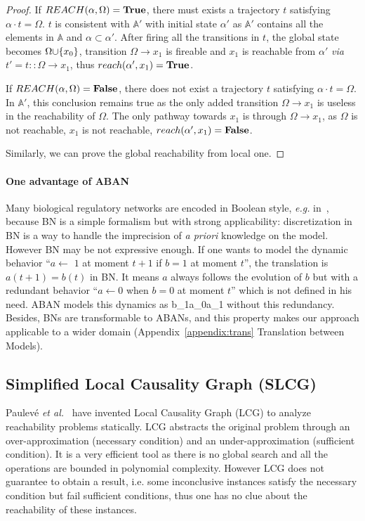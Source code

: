 \begin{proof}
If $REACH(\alpha,\Omega)=\mathbf{True}$, there must exists a trajectory $t$ satisfying $\alpha\cdot t=\Omega$.
$t$ is consistent with $\mathbb{A}'$ with initial state $\alpha'$ as $\mathbb{A}'$ contains all the elements in $\mathbb{A}$ and $\alpha\subset\alpha'$.
After firing all the transitions in $t$, the global state becomes $\Omega\addset{x_0}$, transition $\Omega\to x_1$ is fireable and $x_1$ is reachable from $\alpha'$ \textit{via} $t'=t::\Omega\to x_1$, thus $reach(\alpha', x_1)=\mathbf{True}$. 

If $REACH(\alpha,\Omega)=\mathbf{False}$, there does not exist a trajectory $t$ satisfying $\alpha\cdot t=\Omega$.
In $\mathbb{A}'$, this conclusion remains true as the only added transition $\Omega\to x_1$ is useless in the reachability of $\Omega$.
The only pathway towards $x_1$ is through $\Omega\to x_1$, as $\Omega$ is not reachable, $x_1$ is not reachable, $reach(\alpha', x_1)=\mathbf{False}$.

Similarly, we can prove the global reachability from local one.
\end{proof}

\paragraph{\textbf{One advantage of ABAN}}\label{par:advantage}
Many biological regulatory networks are encoded in Boolean style, \textit{e.g.} in~\cite{akutsu2007control,kauffman1969}, because BN is a simple formalism but with strong applicability: discretization in BN is a way to handle the imprecision of \textit{a priori} knowledge on the model.
However BN may be not expressive enough.
If one wants to model the dynamic behavior ``$a\gets$ $1$ at moment $t+1$ if $b=1$ at moment $t$'', the translation is $a(t+1)=b(t)$ in BN.
It means $a$ always follows the evolution of $b$ but with a redundant behavior ``$a\gets 0$ when $b=0$ at moment $t$'' which is not defined in his need.
ABAN models this dynamics as \ac{b_1}{a_0}{a_1} without this redundancy. 
Besides, BNs are transformable to ABANs, and this property makes our approach applicable to a wider domain (Appendix~\ref{appendix:trans} Translation between Models).

\subsection{Simplified Local Causality Graph (SLCG)}\label{sec:SLCG}
Paulev\'e \textit{et al.}~\cite{pauleve2011} have invented Local Causality Graph (LCG) to analyze reachability problems statically.
LCG abstracts the original problem through an over-approximation (necessary condition) and an under-approximation (sufficient condition).
It is a very efficient tool as there is no global search and all the operations are bounded in polynomial complexity.
However LCG does not guarantee to obtain a result, i.e. some inconclusive instances satisfy the necessary condition but fail sufficient conditions, thus one has no clue about the reachability of these instances.


